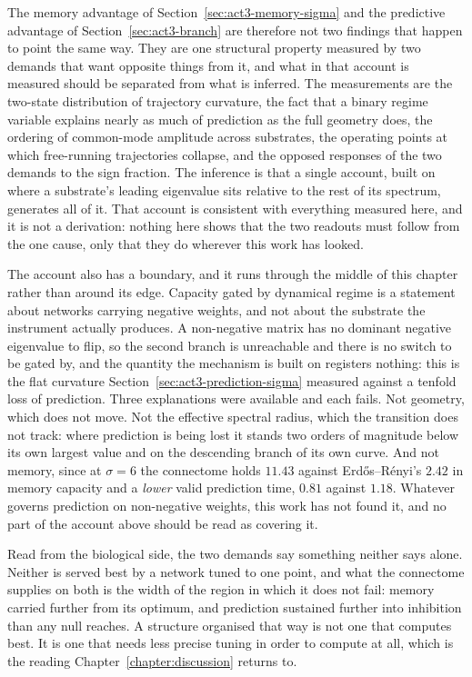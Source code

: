 The memory advantage of Section~\ref{sec:act3-memory-sigma} and the predictive
advantage of Section~\ref{sec:act3-branch} are therefore not two findings that
happen to point the same way. They are one structural property measured by two
demands that want opposite things from it, and what in that account is measured
should be separated from what is inferred. The measurements are the two-state
distribution of trajectory curvature, the fact that a binary regime variable
explains nearly as much of prediction as the full geometry does, the ordering of
common-mode amplitude across substrates, the operating points at which
free-running trajectories collapse, and the opposed responses of the two demands
to the sign fraction. The inference is that a single account, built on where a
substrate's leading eigenvalue sits relative to the rest of its spectrum,
generates all of it. That account is consistent with everything measured here, and it is not a
derivation: nothing here shows that the two readouts must follow from the one
cause, only that they do wherever this work has looked.

The account also has a boundary, and it runs through the middle of this chapter
rather than around its edge. Capacity gated by dynamical regime is a statement
about networks carrying negative weights, and not about the substrate the
instrument actually produces. A non-negative matrix has no dominant negative
eigenvalue to flip, so the second branch is unreachable and there is no switch to
be gated by, and the quantity the mechanism is built on registers nothing: this
is the flat curvature Section~\ref{sec:act3-prediction-sigma} measured against a
tenfold loss of prediction. Three explanations were available and each fails.
Not geometry, which does not move. Not the
effective spectral radius, which the transition does not track: where prediction
is being lost it stands two orders of magnitude below its own largest value and
on the descending branch of its own
curve. %
And not memory, since at $\sigma = 6$ the connectome holds
$11.43$ against Erdős--Rényi's $2.42$ %
in memory capacity and a \emph{lower} valid prediction time,
$0.81$ against $1.18$. %
Whatever governs prediction on non-negative weights, this work has not found it,
and no part of the account above should be read as covering it.

Read from the biological side, the two demands say something neither says
alone. Neither is served best by a network tuned to one point, and what the
connectome supplies on both is the width of the region in which it does not fail:
memory carried further from its optimum, and prediction sustained further into
inhibition than any null reaches. A structure organised that way is not one that
computes best. It is one that needs less precise tuning in order to compute at
all, which is the reading Chapter~\ref{chapter:discussion} returns to.
